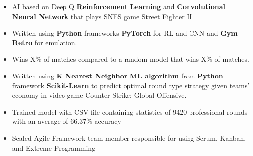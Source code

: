 
\smallskip
\begin{itemize}
\item AI based on Deep Q \textbf{Reinforcement Learning} and \textbf{Convolutional Neural Network} that plays SNES game Street Fighter II
\smallskip
\item Written using \textbf{Python} frameworks \textbf{PyTorch} for RL and CNN and \textbf{Gym Retro} for emulation.
\smallskip
\item Wins X\% of matches compared to a random model that wins X\% of matches.
\end{itemize}

\divider

\begin{itemize}
\item Written using \textbf{K Nearest Neighbor ML algorithm} from \textbf{Python} framework \textbf{Scikit-Learn} to predict optimal round type strategy given teams' economy in video game Counter Strike: Global Offensive.
\smallskip
\item Trained model with CSV file containing statistics of 9420 professional rounds with an average of 66.37\% accuracy
\end{itemize}






\begin{itemize}
\item Scaled Agile Framework team member responsible for using Scrum, Kanban, and Extreme Programming
\end{itemize}







\divider

